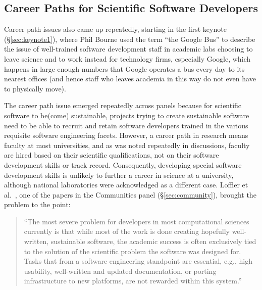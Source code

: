 \documentclass[11pt, oneside]{amsart}
\newcommand{\note}[1]{ {\textcolor{red}    { #1 }}}
\begin{document}
\subsection{Career Paths for Scientific Software Developers}\label{sec:career-tracks} %

Career path issues also came up repeatedly, starting in the first
keynote (\S\ref{sec:keynote1}), where Phil Bourne used the term ``the
Google Bus'' to describe the issue of well-trained software
development staff in academic labs choosing to leave science and to
work instead for technology firms, especially Google, which happens in
large enough numbers that Google operates a bus every day to its
nearest offices (and hence staff who leaves academia in this way do
not even have to physically move).

The career path issue emerged repeatedly across panels because for
scientific software to be(come) sustainable, projects trying to create
sustainable software need to be able to recruit and retain software
developers trained in the various requisite software engineering
facets.  However, a career path in research means faculty at most
universities, and as was noted repeatedly in discussions, faculty
are hired based on their scientific qualifications, not on their
software development skills or track record. Consequently, developing
special software development skills is unlikely to further a career in
science at a university, although national laboratories were
acknowledged as a different case. Loffler et
al.~\cite{Loffler_WSSSPE}, one of the papers in the Communities panel
(\S\ref{sec:community}), brought the problem to the point:
\begin{quote}
  ``The most severe problem for developers in most computational
  sciences currently is that while most of the work is done creating
  hopefully well-written, sustainable software, the academic success
  is often exclusively tied to the solution of the scientific problem
  the software was designed for. Tasks that from a software
  engineering standpoint are essential, e.g., high usability,
  well-written and updated documentation, or porting infrastructure to
  new platforms, are not rewarded within this system.'' ~\cite{Loffler_WSSSPE}
\end{quote}
\end{document}
